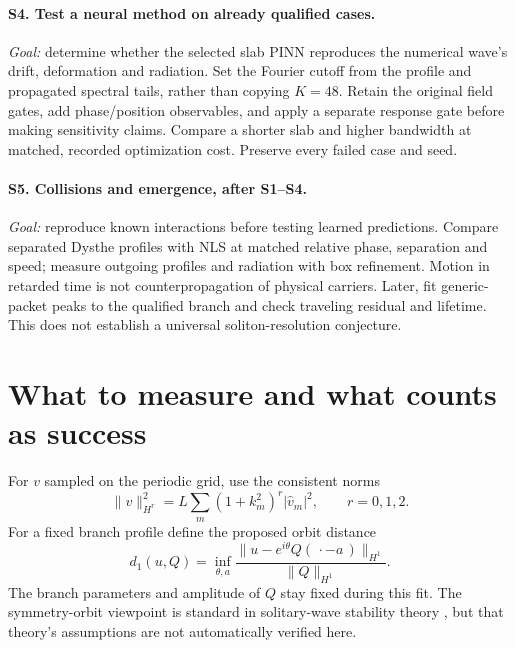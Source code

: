 \documentclass[11pt]{article}
\begin{document}
\paragraph{S4. Test a neural method on already qualified cases.}
\emph{Goal:} determine whether the selected slab PINN reproduces the numerical
wave's drift, deformation and radiation. Set the Fourier cutoff from the profile
and propagated spectral tails, rather than copying $K=48$. Retain the original
field gates, add phase/position observables, and apply a separate response gate
before making sensitivity claims. Compare a shorter slab and higher bandwidth
at matched, recorded optimization cost. Preserve every failed case and seed.

\paragraph{S5. Collisions and emergence, after S1--S4.}
\emph{Goal:} reproduce known interactions before testing learned predictions.
Compare separated Dysthe profiles with NLS at matched relative phase, separation
and speed; measure outgoing profiles and radiation with box refinement. Motion
in retarded time is not counterpropagation of physical carriers. Later, fit
generic-packet peaks to the qualified branch and check traveling residual and
lifetime. This does not establish a universal soliton-resolution conjecture.

\newpage
\section{What to measure and what counts as success}
For $v$ sampled on the periodic grid, use the consistent norms
\[
\|v\|_{H^r}^2=L\sum_m(1+k_m^2)^r|\widehat v_m|^2,
\qquad r=0,1,2.
\]
For a fixed branch profile define the proposed orbit distance
\begin{equation}\label{eq:orbit}
d_1(u,Q)=\inf_{\theta,a}
\frac{\|u-e^{i\theta}Q(\,\cdot-a\,)\|_{H^1}}{\|Q\|_{H^1}}.
\end{equation}
The branch parameters and amplitude of $Q$ stay fixed during this fit.
The symmetry-orbit viewpoint is standard in solitary-wave stability theory
\cite{gss}, but that theory's assumptions are not automatically verified here.
\end{document}
